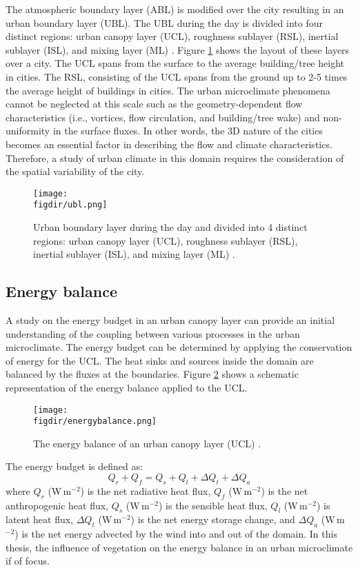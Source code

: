 The atmospheric boundary layer (ABL) is modified over the city resulting in an urban boundary layer (UBL). The UBL during the day is divided into four distinct regions: urban canopy layer (UCL), roughness sublayer (RSL), inertial sublayer (ISL), and mixing layer (ML) \citep{Oke2017a}. Figure \ref{fig:ubl} shows the layout of these layers over a city. The UCL spans from the surface to the average building/tree height in cities. The RSL, consisting of the UCL spans from the ground up to 2-5 times the average height of buildings in cities. The urban microclimate phenomena cannot be neglected at this scale such as the geometry-dependent flow characteristics (i.e., vortices, flow circulation, and building/tree wake) and non-uniformity in the surface fluxes. In other words, the 3D nature of the cities becomes an essential factor in describing the flow and climate characteristics. Therefore, a study of urban climate in this domain requires the consideration of the spatial variability of the city.

	\begin{figure}[t]
		\centering
		\texttt{[image: \\figdir/ubl.png]}
		\caption{Urban boundary layer during the day and divided into 4 distinct regions: urban canopy layer (UCL), roughness sublayer (RSL), inertial sublayer (ISL), and mixing layer (ML) \citep{Oke2017a}.}
		\label{fig:ubl}
	\end{figure}

\subsection{Energy balance}
\label{subsec:energybalance}

A study on the energy budget in an urban canopy layer can provide an initial understanding of the coupling between various processes in the urban microclimate. The energy budget can be determined by applying the conservation of energy for the UCL. The heat sinks and sources inside the domain are balanced by the fluxes at the boundaries. Figure \ref{fig:energybalance} shows a schematic representation of the energy balance applied to the UCL. 

	\begin{figure}[t]
		\centering
		\texttt{[image: \\figdir/energybalance.png]}
		\caption{The energy balance of an urban canopy layer (UCL) \citep{Oke2017a}.}
		\label{fig:energybalance}
	\end{figure}

The energy budget is defined as:
	\begin{equation}
	Q_r + Q_f = Q_s + Q_l + \Delta Q_t + \Delta Q_a
	\end{equation}
where $Q_r$ (W\,m$^{-2}$) is the net radiative heat flux, $Q_f$ (W\,m$^{-2}$) is the net anthropogenic heat flux, $Q_s$ (W\,m$^{-2}$) is the sensible heat flux, $Q_l$ (W\,m$^{-2}$) is latent heat flux, $\Delta Q_t$ (W\,m$^{-2}$) is the net energy storage change, and $\Delta Q_a$ (W\,m$^{-2}$) is the net energy advected by the wind into and out of the domain. In this thesis, the influence of vegetation on the energy balance in an urban microclimate if of focus. 

